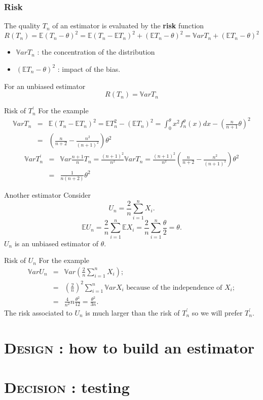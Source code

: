 \documentclass[xcolor=x11names,compress,8pt,handout]{beamer}
\def\Esp{\mathbb{E}}
\def\Var{\mathbb{V}ar}
\renewcommand{\(}{\begin{columns}}
\renewcommand{\)}{\end{columns}}
\newcommand{\<}[1]{\begin{column}{#1}}
\renewcommand{\>}{\end{column}}
\begin{document}
\begin{frame}
\frametitle{Risk}
The quality $T_n$ of an estimator is evaluated by the \textbf{risk} function
\[
R(T_n)=\Esp( T_n -\theta)^2= \Esp(T_n-\Esp T_n)^2+(\Esp T_n-\theta)^2=\Var T_n +(\Esp T_n-\theta)^2
\]\begin{itemize}
\item $\Var T_n$ :  the concentration of the distribution
\item $(\Esp T_n-\theta)^2$ : impact of the bias.
\end{itemize}

For an unbiased estimator
\[
R(T_n)=\Var T_n
\]
\end{frame}
\begin{frame}
\begin{exampleblock}{Risk of $T^\prime_n$}
For the example
\begin{eqnarray*}
\Var T_n &= &\Esp (T_n-\Esp T_n)^2 =\Esp T_n^2 -(\Esp T_n)^2 = \int_0^\theta x^2 f_n^\theta(x) dx - \left(\frac n{n+1}\theta\right)^2\\
&=&\left(\frac n{n+2}- \frac {n^2}{(n+1)^2}\right)\theta^2
\end{eqnarray*}
\begin{eqnarray*}
\Var T_n^\prime &= &\Var \frac {n+1}nT_n= \frac {(n+1)^2}{n^2}\Var T_n= \frac {(n+1)^2}{n^2}\left(\frac n{n+2}- \frac {n^2}{(n+1)^2}\right)\theta^2\\
&=& \frac 1{n(n+2)}\theta^2
\end{eqnarray*}

\end{exampleblock}
\end{frame}
\begin{frame}{Another estimator}
Consider 
\[
U_n = \frac 2n \sum_{i=1}^n X_i.
\]
\[
\Esp U_n = \frac 2n \sum_{i=1}^n \Esp X_i= \frac 2n \sum_{i=1}^n \frac \theta 2= \theta.
\]
$U_n$ is an unbiased estimator of $\theta$.
\begin{exampleblock}{Risk of $U_n$}
For the example
\begin{eqnarray*}
\Var U_n &= &\Var \left(\frac 2n \sum_{i=1}^n X_i\right);\\
&=&\left(\frac 2n\right)^2 \sum_{i=1}^n \Var X_i \text{ because of the independence of } X_i;\\
&=& \frac 4 {n^2} n \frac {\theta^2}{12}= \frac {\theta^2}{3n}.
\end{eqnarray*}
The risk associated to $U_n$ is much larger than the risk of $T^\prime_n$ so we will prefer $T^\prime_n$.
\end{exampleblock}
\end{frame}
\section[{\scshape Design}]{{\scshape Design} : how to build an estimator}
\section[{\scshape Decision}]{{\scshape Decision} : testing}
\end{document}
